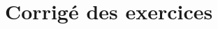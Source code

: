 \section{Corrigé des exercices}
\small

\normalsize
\restoregeometry
\captionsetup{width=0.9\linewidth}
